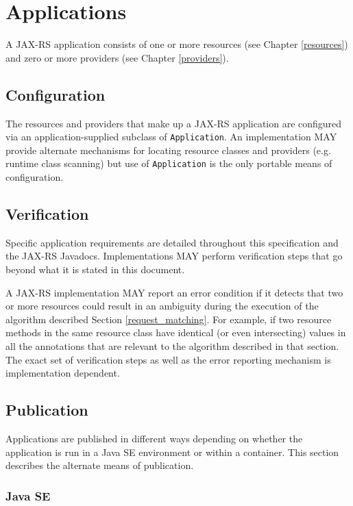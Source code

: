 \chapter{Applications}
\label{applications}

A JAX-RS application consists of one or more resources (see Chapter \ref{resources}) and zero or more providers
(see Chapter \ref{providers}).

\section{Configuration}
\label{config}

\textcolor{highlight green}{The resources and providers that make up a JAX-RS application are configured via an
application-supplied subclass of \lstinline{Application}}. An implementation MAY provide alternate mechanisms for
locating resource classes and providers (e.g. runtime class scanning) but use of \lstinline{Application} is the only
portable means of configuration.

\section{Verification}
\label{verification}

Specific application requirements are detailed throughout this specification and the JAX-RS Javadocs. Implementations
MAY perform verification steps that go beyond what it is stated in this document.

A JAX-RS implementation MAY report an error condition if it detects that two or more resources could result in an
ambiguity during the execution of the algorithm described Section \ref{request_matching}. For example, if two resource
methods in the same resource class have identical (or even intersecting) values in all the annotations that are relevant
to the algorithm described in that section. The exact set of verification steps as well as the error reporting mechanism
is implementation dependent.

\section{Publication}

Applications are published in different ways depending on whether the application is run in a Java SE environment or
within a container. This section describes the alternate means of publication.

\subsection{Java SE}

